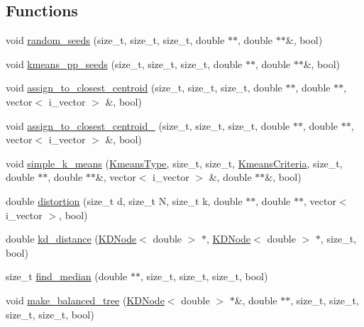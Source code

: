 \subsection*{Functions}
\begin{DoxyCompactItemize}
\item 
void \hyperlink{namespaceSimpleCluster_aa3c1fa27364305d35f14eb0b6b984a10}{random\-\_\-seeds} (size\-\_\-t, size\-\_\-t, size\-\_\-t, double $\ast$$\ast$, double $\ast$$\ast$\&, bool)
\item 
void \hyperlink{namespaceSimpleCluster_ab1abfee692e0476f34c72ac18a68bf17}{kmeans\-\_\-pp\-\_\-seeds} (size\-\_\-t, size\-\_\-t, size\-\_\-t, double $\ast$$\ast$, double $\ast$$\ast$\&, bool)
\item 
void \hyperlink{namespaceSimpleCluster_aca74ac04af2feab94c72dcfe7a26fd9f}{assign\-\_\-to\-\_\-closest\-\_\-centroid} (size\-\_\-t, size\-\_\-t, size\-\_\-t, double $\ast$$\ast$, double $\ast$$\ast$, vector$<$ i\-\_\-vector $>$ \&, bool)
\item 
void \hyperlink{namespaceSimpleCluster_af66bb5dcaeacf5d9a3856fbf793115d5}{assign\-\_\-to\-\_\-closest\-\_\-centroid\-\_} (size\-\_\-t, size\-\_\-t, size\-\_\-t, double $\ast$$\ast$, double $\ast$$\ast$, vector$<$ i\-\_\-vector $>$ \&, bool)
\item 
void \hyperlink{namespaceSimpleCluster_ab12576ad548dd6a6d0ba093c3a637abb}{simple\-\_\-k\-\_\-means} (\hyperlink{namespaceSimpleCluster_a8a8f57121b69a7b43575e4d6a53928e2}{Kmeans\-Type}, size\-\_\-t, size\-\_\-t, \hyperlink{structSimpleCluster_1_1KmeansCriteria}{Kmeans\-Criteria}, size\-\_\-t, double $\ast$$\ast$, double $\ast$$\ast$\&, vector$<$ i\-\_\-vector $>$ \&, double $\ast$$\ast$\&, bool)
\item 
double \hyperlink{namespaceSimpleCluster_a2b5ed423662d1968e1af5262812d7ca8}{distortion} (size\-\_\-t d, size\-\_\-t N, size\-\_\-t k, double $\ast$$\ast$, double $\ast$$\ast$, vector$<$ i\-\_\-vector $>$, bool)
\item 
double \hyperlink{namespaceSimpleCluster_a35cd22686dbc96142da1962ac88caaed}{kd\-\_\-distance} (\hyperlink{classSimpleCluster_1_1KDNode}{K\-D\-Node}$<$ double $>$ $\ast$, \hyperlink{classSimpleCluster_1_1KDNode}{K\-D\-Node}$<$ double $>$ $\ast$, size\-\_\-t, bool)
\item 
size\-\_\-t \hyperlink{namespaceSimpleCluster_aac5892d8292ef724345d8c422519ae05}{find\-\_\-median} (double $\ast$$\ast$, size\-\_\-t, size\-\_\-t, size\-\_\-t, bool)
\item 
void \hyperlink{namespaceSimpleCluster_a9b7733dc2edec70ad323beb9f3a9143e}{make\-\_\-balanced\-\_\-tree} (\hyperlink{classSimpleCluster_1_1KDNode}{K\-D\-Node}$<$ double $>$ $\ast$\&, double $\ast$$\ast$, size\-\_\-t, size\-\_\-t, size\-\_\-t, size\-\_\-t, bool)
$$
\end{DoxyCompactItemize}
